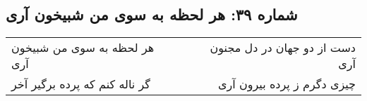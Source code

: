 \begin{center}
\section*{شماره ۳۹: هر لحظه به سوی من شبیخون آری}
\label{sec:039}
\begin{longtable}{l p{0.5cm} r}
هر لحظه به سوی من شبیخون آری
&&
دست از دو جهان در دل مجنون آری
\\
گر ناله کنم که پرده برگیر آخر
&&
چیزی دگرم ز پرده بیرون آری
\\
\end{longtable}
\end{center}
